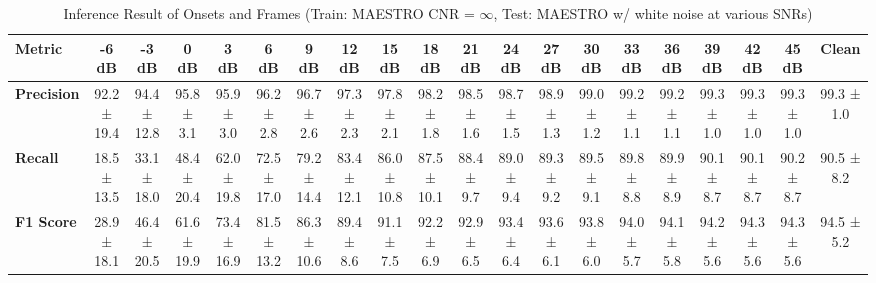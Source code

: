 \documentclass{article}
\begin{document}
\begin{table*}[htbp]
\centering
\caption{Inference Result of Onsets and Frames (Train: MAESTRO CNR = $\infty$, Test: MAESTRO w/ white noise at various SNRs)}
\begin{adjustbox}{max width=\textwidth}
\begin{tabular}{@{}lccccccccccccccccccc@{}}
\toprule
\textbf{Metric} & \textbf{-6 dB} & \textbf{-3 dB} & \textbf{0 dB} & \textbf{3 dB} & \textbf{6 dB} & \textbf{9 dB} & \textbf{12 dB} & \textbf{15 dB} & \textbf{18 dB} & \textbf{21 dB} & \textbf{24 dB} & \textbf{27 dB} & \textbf{30 dB} & \textbf{33 dB} & \textbf{36 dB} & \textbf{39 dB} & \textbf{42 dB} & \textbf{45 dB} & \textbf{Clean} \\ 
\midrule
\textbf{Precision} & 92.2 ± 19.4 & 94.4 ± 12.8 & 95.8 ± 3.1 & 95.9 ± 3.0 & 96.2 ± 2.8 & 96.7 ± 2.6 & 97.3 ± 2.3 & 97.8 ± 2.1 & 98.2 ± 1.8 & 98.5 ± 1.6 & 98.7 ± 1.5 & 98.9 ± 1.3 & 99.0 ± 1.2 & 99.2 ± 1.1 & 99.2 ± 1.1 & 99.3 ± 1.0 & 99.3 ± 1.0 & 99.3 ± 1.0 & 99.3 ± 1.0 \\
\textbf{Recall}    & 18.5 ± 13.5 & 33.1 ± 18.0 & 48.4 ± 20.4 & 62.0 ± 19.8 & 72.5 ± 17.0 & 79.2 ± 14.4 & 83.4 ± 12.1 & 86.0 ± 10.8 & 87.5 ± 10.1 & 88.4 ± 9.7 & 89.0 ± 9.4 & 89.3 ± 9.2 & 89.5 ± 9.1 & 89.8 ± 8.8 & 89.9 ± 8.9 & 90.1 ± 8.7 & 90.1 ± 8.7 & 90.2 ± 8.7 & 90.5 ± 8.2 \\
\textbf{F1 Score} & 28.9 ± 18.1 & 46.4 ± 20.5 & 61.6 ± 19.9 & 73.4 ± 16.9 & 81.5 ± 13.2 & 86.3 ± 10.6 & 89.4 ± 8.6 & 91.1 ± 7.5 & 92.2 ± 6.9 & 92.9 ± 6.5 & 93.4 ± 6.4 & 93.6 ± 6.1 & 93.8 ± 6.0 & 94.0 ± 5.7 & 94.1 ± 5.8 & 94.2 ± 5.6 & 94.3 ± 5.6 & 94.3 ± 5.6 & 94.5 ± 5.2 \\
\bottomrule
\end{tabular}
\end{adjustbox}
\end{table*}
\end{document}
